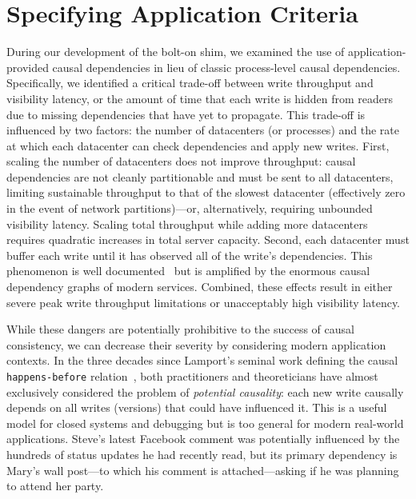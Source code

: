\section{Specifying Application Criteria} 
\label{sec:explicitcausality}

During our development of the bolt-on shim, we examined the use of
application-provided causal dependencies in lieu of classic
process-level causal dependencies. Specifically, we identified a
critical trade-off between write throughput and visibility latency, or
the amount of time that each write is hidden from readers due to
missing dependencies that have yet to propagate. This trade-off is
influenced by two factors: the number of datacenters (or processes)
and the rate at which each datacenter can check dependencies and apply
new writes. First, scaling the number of datacenters does not improve
throughput: causal dependencies are not cleanly partitionable and must
be sent to all datacenters, limiting sustainable throughput to that of
the slowest datacenter (effectively zero in the event of network
partitions)---or, alternatively, requiring unbounded visibility
latency. Scaling total throughput while adding more datacenters
requires quadratic increases in total server capacity. Second, each
datacenter must buffer each write until it has observed all of the
write's dependencies. This phenomenon is well documented~\cite{catocs}
but is amplified by the enormous causal dependency graphs of modern
services. Combined, these effects result in either severe peak write
throughput limitations or unacceptably high visibility latency.

While these dangers are potentially prohibitive to the success of
causal consistency, we can decrease their severity by considering
modern application contexts. In the three decades since Lamport's
seminal work defining the causal \texttt{happens-before}
relation~\cite{lamportclocks}, both practitioners and theoreticians
have almost exclusively considered the problem of \textit{potential
  causality}: each new write causally depends on all writes (versions)
that could have influenced it. This is a useful model for closed
systems and debugging but is too general for modern real-world
applications. Steve's latest Facebook comment was potentially
influenced by the hundreds of status updates he had recently read, but
its primary dependency is Mary's wall post---to which his comment is
attached---asking if he was planning to attend her party.

